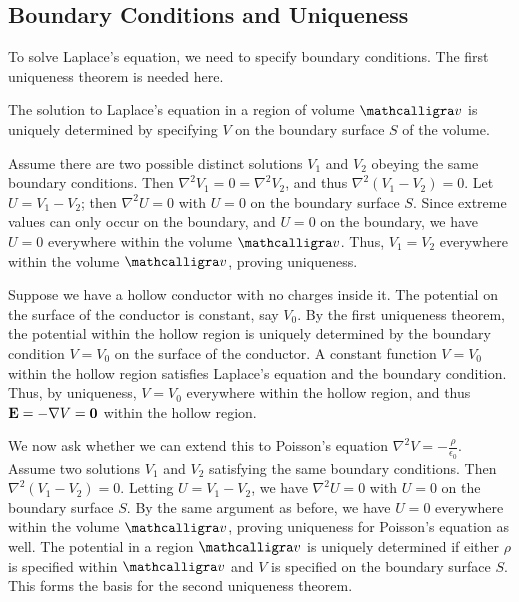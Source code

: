 \subsection{Boundary Conditions and Uniqueness}

To solve Laplace's equation, we need to specify boundary conditions. The first uniqueness theorem is needed here.

\begin{theorem}
    The solution to Laplace's equation in a region of volume $\curs{v}$ is uniquely determined by specifying $V$ on the boundary surface $S$ of the volume.
\end{theorem}

Assume there are two possible distinct solutions $V_{1}$ and $V_{2}$ obeying the same boundary conditions. Then $\nabla^{2} V_{1} = 0 = \nabla^{2} V_{2}$, and thus $\nabla^{2} (V_{1} - V_{2}) = 0$. Let $U = V_{1} - V_{2}$; then $\nabla^{2} U = 0$ with $U = 0$ on the boundary surface $S$. Since extreme values can only occur on the boundary, and $U = 0$ on the boundary, we have $U = 0$ everywhere within the volume $\curs{v}$. Thus, $V_{1} = V_{2}$ everywhere within the volume $\curs{v}$, proving uniqueness.

Suppose we have a hollow conductor with no charges inside it. The potential on the surface of the conductor is constant, say $V_{0}$. By the first uniqueness theorem, the potential within the hollow region is uniquely determined by the boundary condition $V = V_{0}$ on the surface of the conductor. A constant function $V = V_{0}$ within the hollow region satisfies Laplace's equation and the boundary condition. Thus, by uniqueness, $V = V_{0}$ everywhere within the hollow region, and thus $\mathbf{E} = - \nabla V = \mathbf{0}$ within the hollow region.

We now ask whether we can extend this to Poisson's equation $\nabla^{2} V = - \frac{\rho}{\epsilon_{0}}$. Assume two solutions $V_{1}$ and $V_{2}$ satisfying the same boundary conditions. Then $\nabla^{2} (V_{1} - V_{2}) = 0$. Letting $U = V_{1} - V_{2}$, we have $\nabla^{2} U = 0$ with $U = 0$ on the boundary surface $S$. By the same argument as before, we have $U = 0$ everywhere within the volume $\curs{v}$, proving uniqueness for Poisson's equation as well. The potential in a region $\curs{v}$ is uniquely determined if either $\rho$ is specified within $\curs{v}$ and $V$ is specified on the boundary surface $S$. This forms the basis for the second uniqueness theorem.


